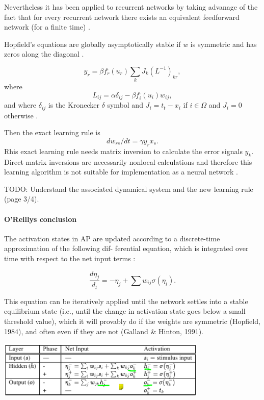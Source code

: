 Nevertheless it has been applied to recurrent networks by taking advanage of the fact that for every recurrent network there exists an equivalent feedforward network (for a finite time) \cite{pineda1987generalization}.

Hopfield's equations are globally asymptotically stable if $w$ is symmetric and has zeros along the diagonal \cite{pineda1987generalization}.

$$y_r = \beta f_r^,(u_r)\sum_k J_k(L^{-1})_{kr},$$
where 
$$L_{ij} = \alpha \delta_{ij} - \beta f_i^,(u_i)w_{ij},$$
and where $\delta_{ij}$ is the Kronecker $\delta$ symbol and $J_i = t_t - x_i$ if $i \in \Omega$ and $J_i = 0$ otherwise \cite{pineda1987generalization}. 

Then the exact learning rule is 
$$dw_{rs}/dt = \gamma y_r x_s.$$
Rhis exact learning rule needs matrix inversion to calculate the error signals $y_k$. Direct matrix inversions are necessarily nonlocal calculations and therefore this learning algorithm is not suitable for implementation as a neural network \cite{pineda1987generalization}. 

TODO: Understand the associated dynamical system and the new learning rule (page 3/4). 

\paragraph{O'Reillys conclusion}
\cite{o1996bio}
The activation states in AP are updated according to a discrete-time approximation of the following dif-
ferential equation, which is integrated over time with respect to the net input terms :

$$\frac{d\eta_j}{d_t} = -\eta_j + \sum w_{ij} \sigma(\eta_i).$$

This equation can be iteratively applied until the network settles into a stable equilibrium state (i.e., until the
change in activation state goes below a small threshold value), which it will provably do if the weights are
symmetric (Hopfield, 1984), and often even if they are not (Galland \& Hinton, 1991).

\includegraphics[width=10cm]{img/table_ap.png}
